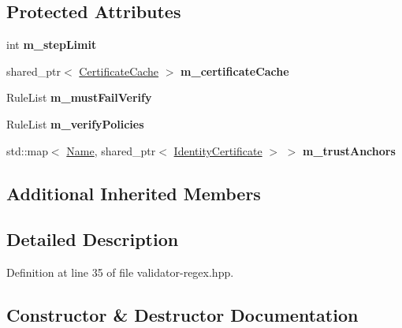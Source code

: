 \subsection*{Protected Attributes}
\begin{DoxyCompactItemize}
\item 
int {\bfseries m\+\_\+step\+Limit}\hypertarget{classndn_1_1ValidatorRegex_a8c226e730194a56e9e07a4507352ea5e}{}\label{classndn_1_1ValidatorRegex_a8c226e730194a56e9e07a4507352ea5e}

\item 
shared\+\_\+ptr$<$ \hyperlink{classndn_1_1CertificateCache}{Certificate\+Cache} $>$ {\bfseries m\+\_\+certificate\+Cache}\hypertarget{classndn_1_1ValidatorRegex_a6b22fdc5a8dc11c2ab4e6de230f6c928}{}\label{classndn_1_1ValidatorRegex_a6b22fdc5a8dc11c2ab4e6de230f6c928}

\item 
Rule\+List {\bfseries m\+\_\+must\+Fail\+Verify}\hypertarget{classndn_1_1ValidatorRegex_aeed73b5fc3b3517ac76dfd2bf3812898}{}\label{classndn_1_1ValidatorRegex_aeed73b5fc3b3517ac76dfd2bf3812898}

\item 
Rule\+List {\bfseries m\+\_\+verify\+Policies}\hypertarget{classndn_1_1ValidatorRegex_a1c83a5604c202920242fde08b6784a90}{}\label{classndn_1_1ValidatorRegex_a1c83a5604c202920242fde08b6784a90}

\item 
std\+::map$<$ \hyperlink{classndn_1_1Name}{Name}, shared\+\_\+ptr$<$ \hyperlink{classndn_1_1IdentityCertificate}{Identity\+Certificate} $>$ $>$ {\bfseries m\+\_\+trust\+Anchors}\hypertarget{classndn_1_1ValidatorRegex_a207b5cbe9f0d6fafd80770e0bd90a271}{}\label{classndn_1_1ValidatorRegex_a207b5cbe9f0d6fafd80770e0bd90a271}

\end{DoxyCompactItemize}
\subsection*{Additional Inherited Members}


\subsection{Detailed Description}


Definition at line 35 of file validator-\/regex.\+hpp.



\subsection{Constructor \& Destructor Documentation}
